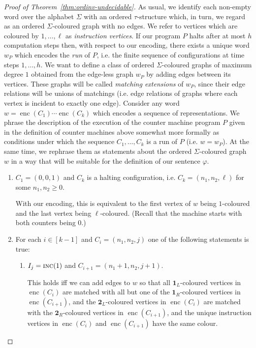 \documentclass[11pt]{article}
\renewcommand{\phi}{\varphi}
\newcommand{\IONE}{\mathbf{1}}
\newcommand{\ITWO}{\mathbf{2}}
\newcommand{\IONEL}{\IONE_L}
\newcommand{\IONER}{\IONE_R}
\newcommand{\ITWOL}{\ITWO_L}
\newcommand{\ITWOR}{\ITWO_R}
\newcommand{\enc}{\operatorname{enc}} \newcommand{\inc}{\textsc{inc}}
\begin{document}
\begin{proof}[Proof of Theorem~\ref{thm:ordinv-undecidable}]
  As usual, we identify each non-empty word over the alphabet $\Sigma$
  with an ordered $\tau$-structure which, in turn, we regard as an
  ordered $\Sigma$-coloured graph with no edges.  We refer to vertices
  which are coloured by $1, \ldots, \ell$ as \emph{instruction
    vertices}. If our program $P$ halts after at most $h$ computation
  steps then, with respect to our encoding, there exists a unique word
  $w_P$ which encodes the \emph{run} of $P$, i.e. the finite sequence
  of configurations at time steps $1, \ldots, h$. We want to define a
  class of ordered $\Sigma$-coloured graphs of maximum degree $1$
  obtained from the edge-less graph $w_P$ by adding edges between its
  vertices. These graphs will be called \emph{matching extensions} of
  $w_P$, since their edge relations will be unions of matchings
  (i.e. edge relations of graphs where each vertex is incident to
  exactly one edge).  Consider any word $w=\enc(C_1)\dotsb\enc(C_k)$
  which encodes a sequence of representations. We phrase the
  description of the execution of the counter machine program $P$
  given in the definition of counter machines above somewhat more
  formally as conditions under which the sequence $C_1, \ldots, C_k$
  is a run of $P$ (i.e. $w=w_P$).  At the same time, we rephrase them
  as statements about the ordered $\Sigma$-coloured graph $w$ in a way
  that will be suitable for the definition of our sentence $\phi$.
  \begin{enumerate}
  \item $C_1=(0,0,1)$ and $C_k$ is a halting configuration,
    i.e. $C_k=(n_1,n_2,\ell)$ for some $n_1,n_2 \geq 0$.
  
    With our encoding, this is equivalent to the first vertex of $w$ being
    $1$-coloured and the last vertex being $\ell$-coloured. (Recall
    that the machine starts with both counters being $0$.)
  
  \item For each $i\in [k-1]$ and $C_i=(n_1,n_2,j)$ one of the
    following statements is true:
    \begin{enumerate}
    \item $I_j=\inc(1)$ and $C_{i+1}=(n_1+1,n_2,j+1)$.

      This holds iff we can add edges to $w$ so that all
      $\IONEL$-coloured vertices in $\enc(C_i)$ are matched with
      all but one of the $\IONER$-coloured vertices in
      $\enc(C_{i+1})$, and the $\ITWOL$-coloured vertices in
      $\enc(C_i)$ are matched with the $\ITWOR$-coloured
      vertices in $\enc(C_{i+1})$, and the unique instruction vertices
      in $\enc(C_i)$ and $\enc(C_{i+1})$ have the same colour.
      

\end{enumerate}
\end{enumerate}
\end{proof}
\end{document}
